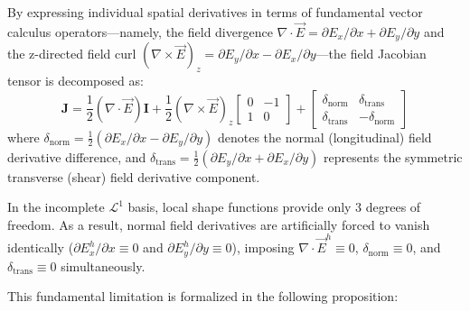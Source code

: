 \documentclass[preprint,12pt]{elsarticle}
\begin{document}
By expressing individual spatial derivatives in terms of fundamental vector calculus operators---namely, the field divergence $\nabla \cdot \vec{E} = \partial E_x/\partial x + \partial E_y/\partial y$ and the z-directed field curl $(\nabla \times \vec{E})_z = \partial E_y/\partial x - \partial E_x/\partial y$---the field Jacobian tensor is decomposed as:
\begin{equation}
\mathbf{J} = \frac{1}{2}(\nabla \cdot \vec{E}) \mathbf{I} + \frac{1}{2}(\nabla \times \vec{E})_z \begin{bmatrix} 0 & -1 \\ 1 & 0 \end{bmatrix} + \begin{bmatrix} \delta_{\mathrm{norm}} & \delta_{\mathrm{trans}} \\ \delta_{\mathrm{trans}} & -\delta_{\mathrm{norm}} \end{bmatrix}
\label{eq:jacobian_tensor_EM_decomposition}
\end{equation}
where $\delta_{\mathrm{norm}} = \frac{1}{2}(\partial E_x/\partial x - \partial E_y/\partial y)$ denotes the normal (longitudinal) field derivative difference, and $\delta_{\mathrm{trans}} = \frac{1}{2}(\partial E_y/\partial x + \partial E_x/\partial y)$ represents the symmetric transverse (shear) field derivative component.

In the incomplete $\mathcal{L}^1$ basis, local shape functions provide only 3 degrees of freedom. As a result, normal field derivatives are artificially forced to vanish identically ($\partial E_x^h/\partial x \equiv 0$ and $\partial E_y^h/\partial y \equiv 0$), imposing $\nabla \cdot \vec{E}^h \equiv 0$, $\delta_{\mathrm{norm}} \equiv 0$, and $\delta_{\mathrm{trans}} \equiv 0$ simultaneously.

This fundamental limitation is formalized in the following proposition:
\end{document}
